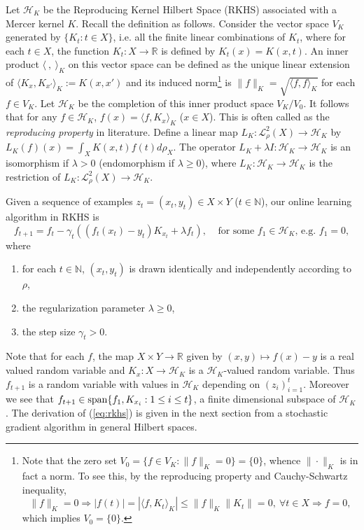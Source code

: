 \documentclass[twoside]{amsart}
\theoremstyle{theorem}
\theoremstyle{definition}
\theoremstyle{remark}
\def\L{{\mathscr L}}
\def\H{{\mathscr H}}
\def\N{{\mathbb N}}
\def\span{{\rm span}}
\def\R{{\mathbb R}}        %
\def\L{{\mathscr L}}     %
\def\<{{\langle}}
\def\>{{\rangle}}
\begin{document}
Let $\H_K$ be the Reproducing Kernel Hilbert Space (RKHS)
associated with a Mercer kernel $K$. Recall the definition as
follows. Consider the vector space $V_K$ generated by $\{K_t:t\in
X\}$, i.e. all the finite linear combinations of $K_t$, where for
each $t\in X$, the function $K_t:X\to \R$ is defined by
$K_t(x)=K(x,t)$. An inner product $\<\ ,\ \>_K$ on this vector
space can be defined as the unique linear extension of
$\<K_x,K_{x'}\>_K:=K(x,x')$ and its induced norm\footnote{Note
that the zero set $V_0=\{f\in V_K: \|f\|_K=0\}=\{0\}$, whence
$\|\cdot\|_K$ is in fact a norm. To see this, by the reproducing
property and Cauchy-Schwartz inequality,
$$ \|f\|_K=0\Rightarrow |f(t)|=|\<f,K_t\>_K| \leq \|f\|_K \|K_t\| =0, \ \forall t\in X\Rightarrow f= 0, $$
which implies $V_0=\{0\}$. } is $\|f\|_K = \sqrt{\<f,f\>_K}$ for
each $f\in V_K$. Let $\H_K$ be the completion of this inner
product space $V_K/V_0$. It follows that for any $f\in \H_K$,
$f(x)=\<f,K_x\>_K$ ($x\in X$). This is often called as the
\emph{reproducing property} in literature. Define a linear map
$L_K:\L^2_\rho(X)\to \H_K$ by $L_K(f)(x)= \int_X K(x,t) f(t) d
\rho_X$. The operator $L_K + \lambda I:\H_K \to \H_K$ is an
isomorphism if $\lambda>0$ (endomorphism if $\lambda\geq 0$),
where $L_K:\H_K \to \H_K$ is the restriction of $L_K:\L^2_\rho(X)
\to \H_K$.

\bigskip

Given a sequence of examples $z_t=(x_t,y_t)\in X\times Y$ ($t\in \N$), our online learning algorithm in RKHS is
\begin{equation}\label{eq:rkhs}
f_{t+1} = f_t - \gamma_t(( f_t(x_t)-y_t) K_{x_t} +\lambda f_t ), \ \ \ \ \ \mbox{for some $f_1 \in \H_K$, e.g. $f_1=0$},
\end{equation}
where
\begin{enumerate}
\item for each $t\in \N$, $(x_t,y_t)$ is drawn identically and independently according to $\rho$,
\item the regularization parameter $\lambda\geq 0$,
\item the step size $\gamma_t>0$.
\end{enumerate}

Note that for each $f$, the map $X\times Y\to \R$ given by
$(x,y)\mapsto f(x)-y$ is a real valued random variable and
$K_x:X\to \H_K$ is a $\H_K$-valued random variable. Thus $f_{t+1}$
is a random variable with values in $\H_K$ depending on
$(z_i)_{i=1}^t$. Moreover we see that $f_{t+1}\in
\span\{f_1,K_{x_i}:1\leq i\leq t\}$, a finite dimensional subspace
of $\H_K$. The derivation of (\ref{eq:rkhs}) is given in the next
section from a stochastic gradient algorithm in general Hilbert
spaces.
\end{document}
